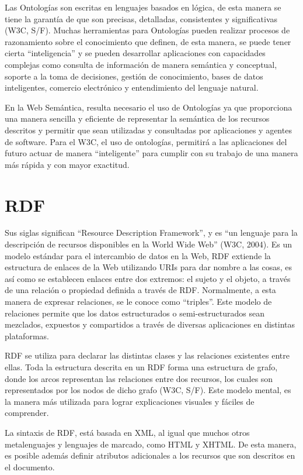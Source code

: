 Las Ontologías son escritas en lenguajes basados en lógica, de esta manera se tiene la garantía de que son precisas, detalladas, consistentes y significativas (W3C, S/F). Muchas herramientas para Ontologías pueden realizar procesos de razonamiento sobre el conocimiento que definen, de esta manera, se puede tener cierta ``inteligencia'' y se pueden desarrollar aplicaciones con capacidades complejas como consulta de información de manera semántica y conceptual, soporte a la toma de decisiones, gestión de conocimiento, bases de datos inteligentes, comercio electrónico y entendimiento del lenguaje natural.

En la Web Semántica, resulta necesario el uso de Ontologías ya que proporciona una manera sencilla y eficiente de representar la semántica de los recursos descritos y permitir que sean utilizadas y consultadas por aplicaciones y agentes de software. Para el W3C, el uso de ontologías, permitirá a las aplicaciones del futuro actuar de manera ``inteligente'' para cumplir con su trabajo de una manera más rápida y con mayor exactitud.

\section{RDF}

Sus siglas significan ``Resource Description Framework'', y es ``un lenguaje para la descripción de recursos disponibles en la World Wide Web'' (W3C, 2004). Es un modelo estándar para el intercambio de datos en la Web, RDF extiende la estructura de enlaces de la Web utilizando URIs para dar nombre a las cosas, es así como se establecen enlaces entre dos extremos: el sujeto y el objeto, a través de una relación o propiedad definida a través de RDF. Normalmente, a esta manera de expresar relaciones, se le conoce como ``triples''. Este modelo de relaciones permite que los datos estructurados o semi-estructurados sean mezclados, expuestos y compartidos a través de diversas aplicaciones en distintas plataformas.

RDF se utiliza para declarar las distintas clases y las relaciones existentes entre ellas. Toda la estructura descrita en un RDF forma una estructura de grafo, donde los arcos representan las relaciones entre dos recursos, los cuales son representados por los nodos de dicho grafo (W3C, S/F). Este modelo mental, es la manera más utilizada para lograr explicaciones visuales y fáciles de comprender.

La sintaxis de RDF, está basada en XML, al igual que muchos otros metalenguajes y lenguajes de marcado, como HTML y XHTML. De esta manera, es posible además definir atributos adicionales a los recursos que son descritos en el documento.

